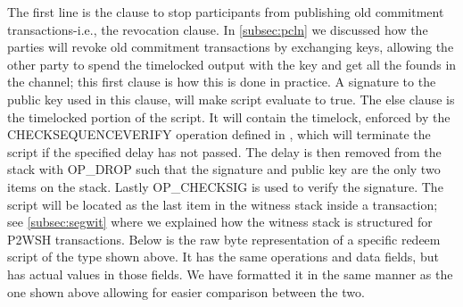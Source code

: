 The first line is the clause to stop participants from publishing old commitment transactions-i.e., the revocation clause. 
 In  \cref{subsec:pcln} we discussed how the parties will revoke old commitment transactions by exchanging keys, allowing the other party to spend the timelocked output with the key and get all the founds in the channel; this first clause is how this is done in practice.
 A signature to the public key used in this clause, will make script evaluate to true.
 The else clause is the timelocked portion of the script. It will contain the timelock, enforced by the CHECKSEQUENCEVERIFY operation defined in \cite{BIP112}, which will terminate the script if the specified delay has not passed. The delay is then removed from the stack with OP\_DROP such that the signature and public key are the only two items on the stack. Lastly OP\_CHECKSIG is used to verify the signature.
The script will be located as the last item in the witness stack inside a transaction; see \cref{subsec:segwit} where we explained how the witness stack is structured for P2WSH transactions. Below is the raw byte representation of a specific redeem script of the type shown above. It has the same operations and data fields, but has actual values in those fields. We have formatted it in the same manner as the one shown above allowing for easier comparison between the two.
\\

\\

